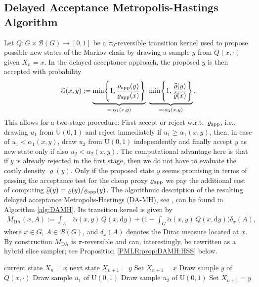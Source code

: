 \documentclass[sn-mathphys-num]{sn-jnl}%
\theoremstyle{thmstyleone}%
\theoremstyle{thmstyletwo}%
\theoremstyle{thmstylethree}%
\newcommand{\rhoapp}{\varrho_{{\rm app}}}
\begin{document}
\subsection{Delayed Acceptance Metropolis-Hastings Algorithm}\label{sec:DAMH}
Let $Q\colon G \times \mathcal B(G)\to [0,1]$ be a $\pi_0$-reversible transition kernel used to propose possible new states of the Markov chain by drawing a sample $y$ from $Q(x,\cdot)$ given $X_n=x$. 
In the delayed acceptance approach, the proposed $y$ is then accepted with probability
\begin{align*}
	\widetilde{\alpha}(x,y):=\underbrace{\text{min}\Bigg\{1, \frac{\rhoapp(y)}{\rhoapp(x)} \Bigg\}}_{=:\alpha_1(x,y)} \ \underbrace{\text{min}\Bigg\{1, \frac{ \widehat{\varrho}(y)}{\widehat{\varrho}(x)} \Bigg\}}_{=:\alpha_2(x,y)}.
\end{align*}
This allows for a two-stage procedure: First accept or reject w.r.t.~$\rhoapp$, i.e., drawing $u_1$ from $\mathrm{U}(0,1)$ and reject immediately if $u_1 \geq \alpha_1(x,y)$, then, in case of $u_1 < \alpha_1(x,y)$, draw $u_2$ from $\mathrm{U}(0,1)$ independently and finally accept $y$ as new state only if also $u_2 < \alpha_2(x,y)$.
The computational advantage here is that if $y$ is already rejected in the first stage, then we do not have to evaluate the costly density $\varrho(y)$.
Only if the proposed state $y$ seems promising in terms of passing the acceptance test for the cheap proxy $\rhoapp$ we pay the additional cost of computing $\widehat{\varrho}(y) = \varrho(y)/\rhoapp(y)$. 
The algorithmic description of the resulting delayed acceptance Metropolis-Hastings (DA-MH), see \cite{ChristenFox2005}, can be found in Algorithm \ref{alg:DAMH}. 
Its transition kernel is given by 
\begin{align*}
	M_{\text{DA}}(x,A):=\int_{A} &\widetilde{\alpha}(x,y) \, Q(x,\mathrm{d}y) + \Big(1-\int_{G} \widetilde{\alpha}(x,y) \,  Q(x,\mathrm{d}y)\Big)\delta_x(A),
\end{align*}
where $x\in G$, $A\in\mathcal{B}(G)$, and $\delta_x(A)$ denotes the Dirac measure located at $x$. 
By construction $M_{\text{DA}}$ is $\pi$-reversible and can, interestingly, be rewritten as a hybrid slice sampler; see Proposition \ref{PMLR:prop:DAMH:HSS} below. %

\begin{algorithm}
	\caption{Delayed Acceptance Metropolis-Hastings}\label{alg:DAMH}
	\renewcommand{\algorithmicrequire}{\textbf{Input:}}
	\renewcommand{\algorithmicensure}{\textbf{Output:}}
	\begin{algorithmic}[1]
		\Require current state $X_n = x$
		\Ensure next state $X_{n+1} = y$
        \State Set $X_{n+1} = x$
        \State Draw sample $y$ of $Q(x, \cdot)$
        \State Draw sample $u_1$ of $\mathrm{U}(0,1)$
        \State Draw sample $u_2$ of $\mathrm{U}(0,1)$
        \State Set $X_{n+1} = y$
        \EndIf
        \EndIf
	\end{algorithmic}
\end{algorithm}
\end{document}
